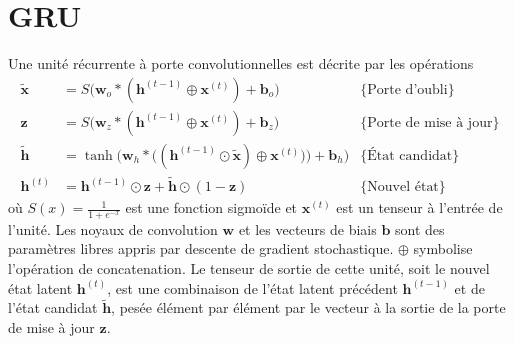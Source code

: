 \chapter{GRU}\label{ap:gru}
Une unité récurrente à porte convolutionnelles est décrite par les opérations
\begin{align}
		\tilde{\mathbf{x}} &= S\bigg( \mathbf{w}_o * (\mathbf{h}^{(t-1)} \oplus \mathbf{x}^{(t)}) + \mathbf{b}_o\bigg) &\{\text{Porte d'oubli}\} \\
		\mathbf{z} &= S\bigg( \mathbf{w}_z * (\mathbf{h}^{(t-1)} \oplus \mathbf{x}^{(t)}) + \mathbf{b}_{z}\bigg)&\{\text{Porte de mise à jour}\} \\
		\tilde{\mathbf{h}} &= \tanh\bigg( \mathbf{w}_h * \big((\mathbf{h}^{(t-1)}\odot \tilde{\mathbf{x}}) \oplus \mathbf{x}^{(t)})\big) + \mathbf{b}_{h}\bigg)&\{\text{État candidat}\} \\
	\label{eq:nouvel etat}
		\mathbf{h}^{(t)} &=\mathbf{h}^{(t-1)} \odot \mathbf{z} + \tilde{\mathbf{h}} \odot (1 - \mathbf{z}) &\{\text{Nouvel état}\} 
\end{align}
où $S(x) = \frac{1}{1 + e^{-x}}$ est une fonction sigmoïde et $\mathbf{x}^{(t)}$ est un tenseur à l'entrée de l'unité. 
Les noyaux de convolution $\mathbf{w}$ et les vecteurs de biais $\mathbf{b}$  
sont des paramètres libres appris par descente de gradient stochastique. $\oplus$ symbolise l'opération 
de concatenation. Le tenseur de sortie de cette unité, soit le nouvel état latent $\mathbf{h}^{(t)}$, 
est une combinaison de l'état latent précédent $\mathbf{h}^{(t-1)}$ et de l'état candidat 
$\tilde{\mathbf{h}}$, pesée élément par élément par le vecteur à la sortie de la porte de mise à jour $\mathbf{z}$.

